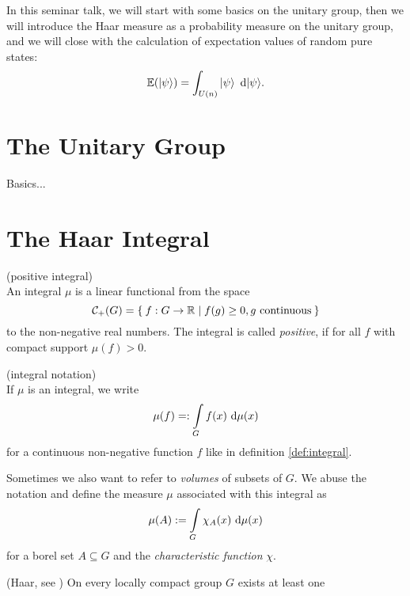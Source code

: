 \documentclass[a4paper,11pt, BCOR=4mm, DIV=12, pagesize]{scrartcl}
\begin{document}
In this seminar talk, we will start with some basics on the unitary group, then 
we will introduce the Haar measure as a probability measure on the unitary 
group, and we will close with the calculation of expectation values of random 
pure states:
\begin{equation}
\mathbb{E}(\ket{\psi}) = \int_{U(n)} \ket{\psi}\ \mathrm{d} |\psi\rangle.
\end{equation}

\section{The Unitary Group}
Basics...

\section{The Haar Integral}

\begin{definition}\label{def:integral} (positive integral)\\
 An integral $\mu$ is a linear functional from the space 
 \begin{equation*}
 \mathcal{C}_+(G) = \Set{f: G\to\mathbb{R}| f(g)\geq 0, g\text{ continuous}} 
 \end{equation*}
 to the non-negative real numbers. The 
integral is called \emph{positive}, if for all $f$ with compact support 
$\mu(f)>0$.
\end{definition}

\begin{notation} (integral notation)\\
  If $\mu$ is an integral, we write
  \begin{equation}
   \mu(f) =: \int\limits_G f(x)\ \mathrm{d}\mu(x)
  \end{equation}
  for a continuous non-negative function $f$ like in definition 
  \ref{def:integral}. 
  
  Sometimes we also want to refer to \emph{volumes} of subsets of $G$. We abuse 
the notation and define the measure $\mu$ associated with this integral as 
  \begin{equation}
   \mu(A) := \int\limits_G \chi_A(x)\ \mathrm{d}\mu(x)
  \end{equation}
  for a borel set $A\subseteq G$ and the \emph{characteristic function} $\chi$.
\end{notation}

\begin{thm} (Haar, see \cite{haar})
 On every locally compact group $G$ exists at least one 
\end{thm}
\end{document}
